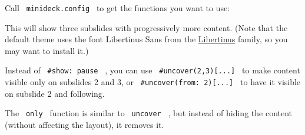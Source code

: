 Call \texttt{\ minideck.config\ } to get the functions you want to use:

\begin{Shaded}
\begin{Highlighting}[]


\NormalTok{\#title{-}slide[}

\NormalTok{]}

\NormalTok{\#slide[}




\NormalTok{]}
\end{Highlighting}
\end{Shaded}

This will show three subslides with progressively more content. (Note
that the default theme uses the font Libertinus Sans from the
\href{https://github.com/alerque/libertinus}{Libertinus} family, so you
may want to install it.)

Instead of \texttt{\ \#show:\ pause\ } , you can use
\texttt{\ \#uncover(2,3){[}...{]}\ } to make content visible only on
subslides 2 and 3, or \texttt{\ \#uncover(from:\ 2){[}...{]}\ } to have
it visible on subslide 2 and following.

The \texttt{\ only\ } function is similar to \texttt{\ uncover\ } , but
instead of hiding the content (without affecting the layout), it removes
it.

\begin{Shaded}
\begin{Highlighting}[]
\NormalTok{\#slide[}
  
\NormalTok{  \#uncover(1, from:3)[}
\NormalTok{  ]}

\NormalTok{  \#only(2,3)[}
\NormalTok{  ]}

\NormalTok{]}
\end{Highlighting}
\end{Shaded}

